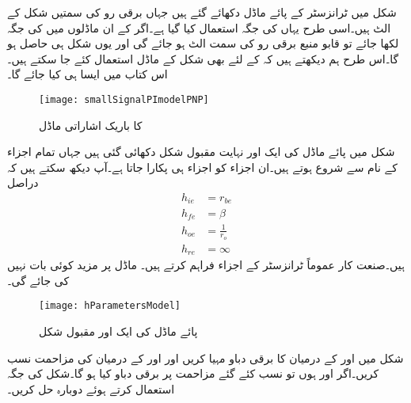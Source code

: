 شکل  میں  ٹرانزسٹر کے پائے ماڈل دکھائے گئے ہیں جہاں برقی رو کی سمتیں  شکل  کے الٹ ہیں۔اسی طرح یہاں  کی جگہ  استعمال کیا گیا ہے۔اگر  کے ان ماڈلوں میں  کی جگہ  لکھا جائے تو قابو منبع برقی رو کی سمت الٹ ہو جائے گی اور  یوں شکل  ہی حاصل ہو گا۔اس طرح ہم دیکھتے ہیں کہ  کے لئے بھی شکل  کے ماڈل استعمال کئے جا سکتے ہیں۔اس کتاب میں ایسا ہی کیا جائے گا۔
\begin{figure}
\centering
\texttt{[image: smallSignalPImodelPNP]}
\caption{ کا باریک اشاراتی  ماڈل}
\label{شکل_باریک_اشاراتی_پائے_ماڈل_الف}
\end{figure}
%
شکل  میں پائے ماڈل کی ایک اور نہایت مقبول شکل دکھائی گئی ہیں جہاں تمام اجزاء کے نام  سے شروع ہوتے ہیں۔ان اجزاء کو  اجزاء ہی پکارا جاتا ہے۔آپ دیکھ سکتے ہیں کہ دراصل
\begin{align*}
h_{ie}&=r_{be}\\
h_{fe}&=\beta\\
h_{oe}&=\frac{1}{r_o}\\
h_{re}&=\infty
\end{align*}
ہیں۔صنعت کار عموماً ٹرانزسٹر کے  اجزاء فراہم کرتے ہیں۔ ماڈل پر مزید کوئی بات نہیں کی جائے گی۔

% 
\begin{figure}
\centering
\texttt{[image: hParametersModel]}
\caption{پائے ماڈل کی ایک اور مقبول شکل}
\label{شکل_باریک_اشاراتی_ایچ_پارامیٹر_پائے_ماڈل}
\end{figure}
شکل  میں  اور  کے درمیان  کا برقی دباو مہیا کریں اور  اور  کے درمیان  کی مزاحمت نسب کریں۔اگر  اور  ہوں تو نسب کئے گئے مزاحمت پر برقی دباو کیا ہو گا۔شکل  کی جگہ  استعمال کرتے ہوئے دوبارہ حل کریں۔

